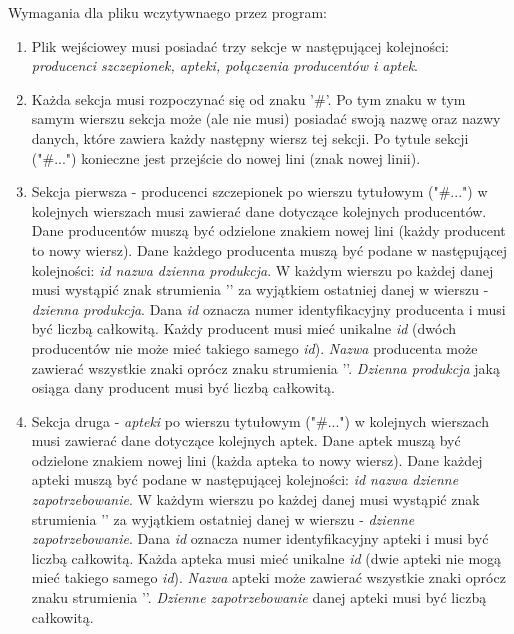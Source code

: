 \documentclass{article}
\begin{document}
Wymagania dla pliku wczytywnaego przez program:
\begin{enumerate}
    \item Plik wejściowey musi posiadać trzy sekcje w następującej kolejności: \emph{producenci szczepionek, apteki, połączenia producentów i aptek}.
    \item Każda sekcja musi rozpoczynać się od znaku '\#'. Po tym znaku w tym samym wierszu sekcja może (ale nie musi) posiadać swoją nazwę oraz nazwy danych, które zawiera każdy następny wiersz tej sekcji. Po tytule sekcji ("\#...") konieczne jest przejście do nowej lini (znak nowej linii).
    \item Sekcja pierwsza - producenci szczepionek po wierszu tytułowym ("\#...") w kolejnych wierszach musi zawierać dane dotyczące kolejnych producentów. Dane producentów muszą być odzielone znakiem nowej lini (każdy producent to nowy wiersz). Dane każdego producenta muszą być podane w następującej kolejności: \emph{id \textbar\space nazwa \textbar\space dzienna produkcja}. W każdym wierszu po każdej danej musi wystąpić znak strumienia '\textbar' za wyjątkiem ostatniej danej w wierszu - \emph{dzienna produkcja}. Dana \emph{id} oznacza numer identyfikacyjny producenta i musi być liczbą całkowitą. Każdy producent musi mieć unikalne \emph{id} (dwóch producentów nie może mieć takiego samego \emph{id}). \emph{Nazwa} producenta może zawierać wszystkie znaki oprócz znaku strumienia '\textbar'. \emph{Dzienna produkcja} jaką osiąga dany producent musi być liczbą całkowitą.
    \item Sekcja druga - \emph{apteki} po wierszu tytułowym ("\#...") w kolejnych wierszach musi zawierać dane dotyczące kolejnych aptek. Dane aptek muszą być odzielone znakiem nowej lini (każda apteka to nowy wiersz). Dane każdej apteki muszą być podane w następującej kolejności: \emph{id \textbar\space nazwa \textbar\space dzienne zapotrzebowanie}. W każdym wierszu po każdej danej musi wystąpić znak strumienia '\textbar' za wyjątkiem ostatniej danej w wierszu - \emph{dzienne zapotrzebowanie}. Dana \emph{id} oznacza numer identyfikacyjny apteki i musi być liczbą całkowitą. Każda apteka musi mieć unikalne \emph{id} (dwie apteki nie mogą mieć takiego samego \emph{id}). \emph{Nazwa} apteki może zawierać wszystkie znaki oprócz znaku strumienia '\textbar'. \emph{Dzienne zapotrzebowanie} danej apteki musi być liczbą całkowitą.

\end{enumerate}
\end{document}
